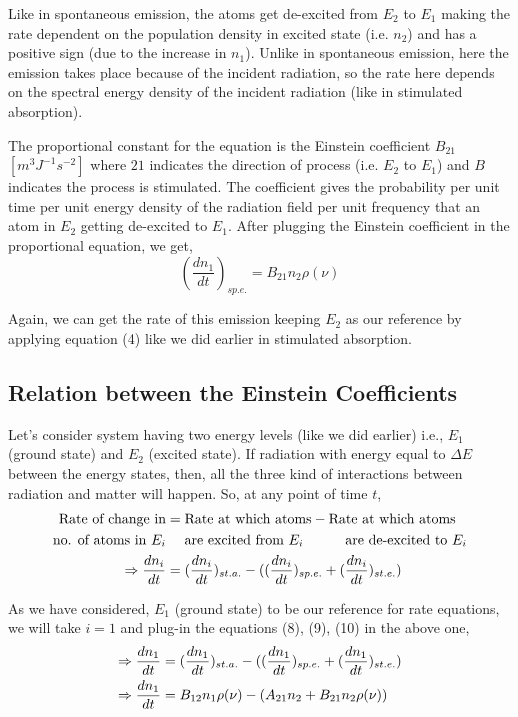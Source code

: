 \documentclass[12pt]{article}
\begin{document}
Like in spontaneous emission, the atoms get de-excited from $E_{2}$ to $E_{1}$ making the rate dependent on the population density in excited state (i.e. $n_{2}$) and has a positive sign (due to the increase in $n_{1}$). Unlike in spontaneous emission, here the emission takes place because of the incident radiation, so the rate here depends on the spectral energy density of the incident radiation (like in stimulated absorption). \vspace{.2cm}

The proportional constant for the equation is the Einstein coefficient $B_{21}$ $[m^{3}J^{-1}s^{-2}]$ where $21$ indicates the direction of process (i.e. $E_{2}$ to $E_{1}$) and $B$ indicates the process is stimulated. The coefficient gives the probability per unit time per unit energy density of the radiation field per unit frequency that an atom in $E_{2}$ getting de-excited to $E_{1}$. After plugging the Einstein coefficient in the proportional equation, we get,
\begin{equation}
    (\frac{dn_{1}}{dt})_{sp.e.} = B_{21}n_{2}\rho(\nu)
\end{equation}

Again, we can get the rate of this emission keeping $E_{2}$ as our reference by applying equation (4) like we did earlier in stimulated absorption.

\subsection{Relation between the Einstein Coefficients}

Let's consider system having two energy levels (like we did earlier) i.e., $E_{1}$ (ground state) and $E_{2}$ (excited state). If radiation with energy equal to $\Delta E$ between the energy states, then, all the three kind of interactions between radiation and matter will happen. So, at any point of time $t$,
\begin{align}
    \text{Rate of change in} & = \text{Rate at which atoms} - \text{Rate at which atoms} \notag \\
    \text{no. of atoms in } E_{i} & \quad \text{ are excited from } E_{i} \quad \qquad \text{are de-excited to } E_{i} \notag \\
    \Rightarrow \frac{dn_{i}}{dt} & = (\frac{dn_{i}}{dt})_{st.a.} - ((\frac{dn_{i}}{dt})_{sp.e.} + (\frac{dn_{i}}{dt})_{st.e.}) \notag
\end{align}

As we have considered, $E_{1}$ (ground state) to be our reference for rate equations, we will take $i = 1$ and plug-in the equations (8), (9), (10) in the above one,
\begin{align}
    \Rightarrow \frac{dn_{1}}{dt} & = (\frac{dn_{1}}{dt})_{st.a.} - ((\frac{dn_{1}}{dt})_{sp.e.} + (\frac{dn_{1}}{dt})_{st.e.}) \notag \\
    \Rightarrow \frac{dn_{1}}{dt} & = B_{12}n_{1}\rho(\nu) - (A_{21}n_{2} + B_{21}n_{2}\rho(\nu))
\end{align}
\end{document}
